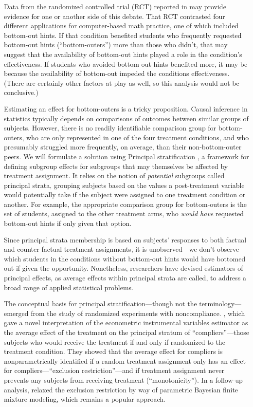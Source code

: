 \documentclass[]{article}
\begin{document}
Data from the randomized controlled trial (RCT) reported in \citet{impactPaper} may provide evidence for one or another side of this debate.
That RCT contrasted four different applications for computer-based math practice, one of which included bottom-out hints.
If that condition benefited students who frequently requested bottom-out hints (``bottom-outers'') more than those who didn't, that may suggest that the availability of bottom-out hints played a role in the condition's effectiveness.
If students who avoided bottom-out hints benefited more, it may be because the availability of bottom-out impeded the conditions effectiveness.
(There are certainly other factors at play as well, so this analysis would not be conclusive.)

Estimating an effect for bottom-outers is a tricky proposition.
Causal inference in statistics typically depends on comparisons of outcomes between similar groups of subjects. However, there is no readily identifiable comparison group for bottom-outers, who are only represented in one of the four treatment conditions, and who presumably struggled more frequently, on average, than their non-bottom-outer peers.
We will formulate a solution using Principal stratification \citep{frangakis}, a  framework for defining subgroup effects for subgroups that may themselves be affected by treatment assignment. It relies on the notion of \emph{potential} subgroups called principal strata, grouping subjects based on the values a post-treatment variable would potentially take if the subject were assigned to one treatment condition or another.
For example, the appropriate comparison group for bottom-outers is the set of students, assigned to the other treatment arms, who \emph{would have} requested bottom-out hints if only given that option.

Since principal strata membership is based on subjects' responses to both factual and counter-factual treatment assignments, it is unobserved---we don't observe which students in the conditions without bottom-out hints would have bottomed out if given the opportunity.
Nonetheless, researchers have devised estimators of principal effects, as average effects within principal strata are called, to address a broad range of applied statistical problems.

The conceptual basis for principal stratification---though not the terminology---emerged from the study of randomized experiments with noncompliance. \citet{air}, which gave a novel interpretation of the econometric instrumental variables estimator as the average effect of the treatment on the principal stratum of ``compliers''---those subjects who would receive the treatment if and only if randomized to the treatment condition. They showed that the average effect for compliers is nonparametrically identified if a random treatment assignment only has an effect for compliers---``exclusion restriction''---and if treatment assignment never prevents any subjects from receiving treatment (``monotonicity'').
In a follow-up analysis, \citet{imbens1997bayesian} relaxed the exclusion restriction by way of parametric Bayesian finite mixture modeling, which remains a popular approach.
\end{document}
